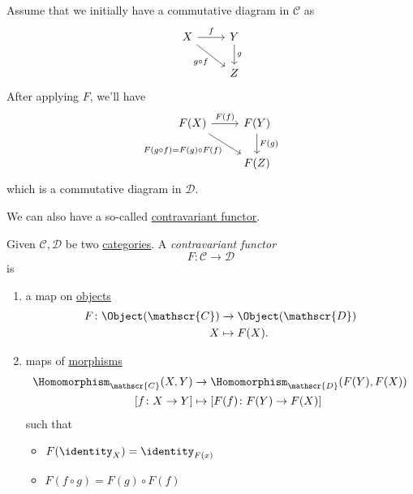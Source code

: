 \begin{prev}
	Assume that we initially have a commutative diagram in \(\mathscr{C} \) as
	\[
		\begin{tikzcd}
			X \ar[rd, "g\circ f"']\ar[r, "f"] & Y\ar[d, "g"]\\
			& Z
		\end{tikzcd}
	\]
	After applying \(F\), we'll have
	\[
		\begin{tikzcd}
			F(X) \ar[rd, "F(g\circ f)=F(g)\circ F(f)"']\ar[r, "F(f)"] & F(Y)\ar[d, "F(g)"]\\
			& F(Z)
		\end{tikzcd}
	\]
	which is a commutative diagram in \(\mathscr{D}\).
\end{prev}

We can also have a so-called \underline{contravariant \hyperref[def:functor]{functor}}.
\begin{definition}\label{def:contravariant-functor}
	Given \(\mathscr{C} , \mathscr{D} \) be two \hyperref[def:category]{categories}. A \emph{contravariant functor}
	\[
		F\colon \mathscr{C} \to \mathscr{D}
	\]
	is
	\begin{enumerate}
		\item a map on \hyperref[def:object]{objects}
		      \[
			      \begin{split}
				      F\colon \Object(\mathscr{C} )&\to \Object(\mathscr{D} )\\
				      X&\mapsto F(X).
			      \end{split}
		      \]
		\item maps of \hyperref[def:morphism]{morphisms}
		      \[
			      \begin{split}
				      \Homomorphism_{\mathscr{C} }(X, Y)&\to \Homomorphism_{\mathscr{D} }(F(Y), F(X))\\
				      \left[f\colon X\to Y\right] &\mapsto \left[F(f)\colon F(Y)\to F(X)\right]
			      \end{split}
		      \]
		      such that
		      \begin{itemize}
			      \item \(F(\identity_{X} ) = \identity_{F(x)} \)
			      \item \(F(f\circ g) = F(g)\circ F(f)\)
		      \end{itemize}
	\end{enumerate}
\end{definition}

